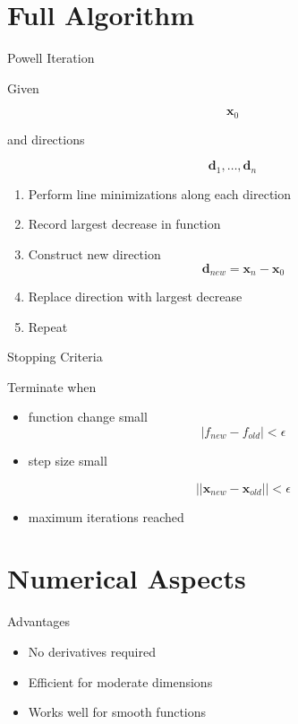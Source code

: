 \documentclass[aspectratio=169]{beamer}
\begin{document}
\section{Full Algorithm}

\begin{frame}{Powell Iteration}

Given

\[
\mathbf{x}_0
\]

and directions

\[
\mathbf{d}_1,\dots,\mathbf{d}_n
\]

\begin{enumerate}
\item Perform line minimizations along each direction
\item Record largest decrease in function
\item Construct new direction
\[
\mathbf{d}_{new} = \mathbf{x}_n - \mathbf{x}_0
\]
\item Replace direction with largest decrease
\item Repeat
\end{enumerate}
\end{frame}

\begin{frame}{Stopping Criteria}

Terminate when

\begin{itemize}
\item function change small
\[
|f_{new}-f_{old}| < \epsilon
\]

\item step size small

\[
||\mathbf{x}_{new}-\mathbf{x}_{old}|| < \epsilon
\]

\item maximum iterations reached
\end{itemize}
\end{frame}

\section{Numerical Aspects}

\begin{frame}{Advantages}

\begin{itemize}
\item No derivatives required
\item Efficient for moderate dimensions
\item Works well for smooth functions
\end{itemize}
\end{frame}
\end{document}
